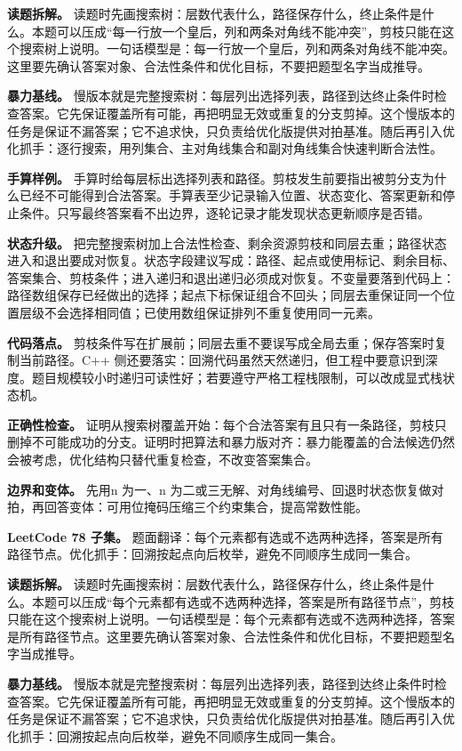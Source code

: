 \textbf{读题拆解。} 读题时先画搜索树：层数代表什么，路径保存什么，终止条件是什么。本题可以压成“每一行放一个皇后，列和两条对角线不能冲突”，剪枝只能在这个搜索树上说明。一句话模型是：每一行放一个皇后，列和两条对角线不能冲突。这里要先确认答案对象、合法性条件和优化目标，不要把题型名字当成推导。

\textbf{暴力基线。} 慢版本就是完整搜索树：每层列出选择列表，路径到达终止条件时检查答案。它先保证覆盖所有可能，再把明显无效或重复的分支剪掉。这个慢版本的任务是保证不漏答案；它不追求快，只负责给优化版提供对拍基准。随后再引入优化抓手：逐行搜索，用列集合、主对角线集合和副对角线集合快速判断合法性。

\textbf{手算样例。} 手算时给每层标出选择列表和路径。剪枝发生前要指出被剪分支为什么已经不可能得到合法答案。手算表至少记录输入位置、状态变化、答案更新和停止条件。只写最终答案看不出边界，逐轮记录才能发现状态更新顺序是否错。

\textbf{状态升级。} 把完整搜索树加上合法性检查、剩余资源剪枝和同层去重；路径状态进入和退出要成对恢复。状态字段建议写成：路径、起点或使用标记、剩余目标、答案集合、剪枝条件；进入递归和退出递归必须成对恢复。不变量要落到代码上：路径数组保存已经做出的选择；起点下标保证组合不回头；同层去重保证同一个位置层级不会选择相同值；已使用数组保证排列不重复使用同一元素。

\textbf{代码落点。} 剪枝条件写在扩展前；同层去重不要误写成全局去重；保存答案时复制当前路径。C++ 侧还要落实：回溯代码虽然天然递归，但工程中要意识到深度。题目规模较小时递归可读性好；若要遵守严格工程栈限制，可以改成显式栈状态机。

\textbf{正确性检查。} 证明从搜索树覆盖开始：每个合法答案有且只有一条路径，剪枝只删掉不可能成功的分支。证明时把算法和暴力版对齐：暴力能覆盖的合法候选仍然会被考虑，优化结构只替代重复检查，不改变答案集合。

\textbf{边界和变体。} 先用n 为一、n 为二或三无解、对角线编号、回退时状态恢复做对拍，再回答变体：可用位掩码压缩三个约束集合，提高常数性能。

\noindent\textbf{LeetCode 78 子集。} 题面翻译：每个元素都有选或不选两种选择，答案是所有路径节点。优化抓手：回溯按起点向后枚举，避免不同顺序生成同一集合。

\textbf{读题拆解。} 读题时先画搜索树：层数代表什么，路径保存什么，终止条件是什么。本题可以压成“每个元素都有选或不选两种选择，答案是所有路径节点”，剪枝只能在这个搜索树上说明。一句话模型是：每个元素都有选或不选两种选择，答案是所有路径节点。这里要先确认答案对象、合法性条件和优化目标，不要把题型名字当成推导。

\textbf{暴力基线。} 慢版本就是完整搜索树：每层列出选择列表，路径到达终止条件时检查答案。它先保证覆盖所有可能，再把明显无效或重复的分支剪掉。这个慢版本的任务是保证不漏答案；它不追求快，只负责给优化版提供对拍基准。随后再引入优化抓手：回溯按起点向后枚举，避免不同顺序生成同一集合。


